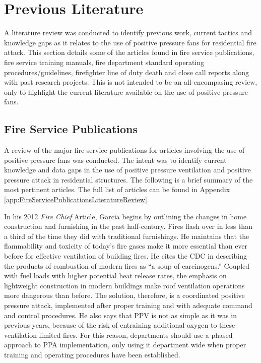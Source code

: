 \documentclass{article}
\begin{document}
\clearpage

\section{Previous Literature}
A literature review was conducted to identify previous work, current tactics and knowledge gaps as it relates to the use of positive pressure fans for residential fire attack. This section details some of the articles found in fire service publications, fire service training manuals, fire department standard operating procedures/guidelines, firefighter line of duty death and close call reports along with past research projects. This is not intended to be an all-encompasing review, only to highlight the current literature available on the use of positive pressure fans. 

\subsection{Fire Service Publications}
A review of the major fire service publications for articles involving the use of positive pressure fans was conducted. The intent was to identify current knowledge and data gaps in the use of positive pressure ventilation and positive pressure attack in residential structures. The following is a brief summary of the most pertinent articles. The full list of articles can be found in Appendix \ref{app:FireServicePublicationsLiteratureReview}. 

In his 2012 \textit{Fire Chief} Article, Garcia begins by outlining the changes in home construction and furnishing in the past half-century. Fires flash over in less than a third of the time they did with traditional furnishings. He maintains that the flammability and toxicity of today’s fire gases make it more essential than ever before for effective ventilation of building fires. He cites the CDC in describing the products of combustion of modern fires as ``a soup of carcinogens.'' Coupled with fuel loads with higher potential heat release rates, the emphasis on lightweight construction in modern buildings make roof ventilation operations more dangerous than before. The solution, therefore, is a coordinated positive pressure attack, implemented after proper training and with adequate command and control procedures. He also says that PPV is not as simple as it was in previous years, because of the risk of entraining additional oxygen to these ventilation limited fires. For this reason, departments should use a phased approach to PPA implementation, only using it department wide when proper training and operating procedures have been established.\cite{GarciaPPVatStructures}
\end{document}
